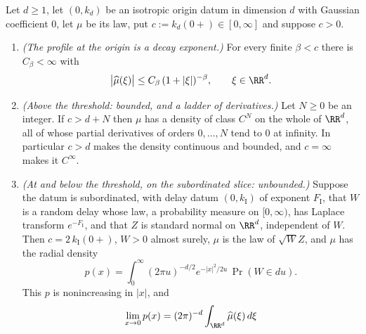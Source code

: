 \begin{theorem}
\label{thm:origin-boundedness-d}
\leanok
Let $d \ge 1$, let $(0, k_d)$ be an isotropic origin datum in dimension $d$ with Gaussian
coefficient $0$, let $\mu$ be its law, put $c := k_d(0{+}) \in [0,\infty]$ and suppose $c > 0$.
\begin{enumerate}
\item \emph{(The profile at the origin is a decay exponent.)} For every finite $\beta < c$ there
is $C_\beta < \infty$ with
\[
  \bigl|\widehat\mu(\xi)\bigr| \le C_\beta\,(1+|\xi|)^{-\beta}, \qquad \xi \in \RR^d .
\]
\item \emph{(Above the threshold: bounded, and a ladder of derivatives.)} Let $N \ge 0$ be an
integer. If $c > d + N$ then $\mu$ has a density of class $C^N$ on the whole of $\RR^d$, all of
whose partial derivatives of orders $0,\dots,N$ tend to $0$ at infinity. In particular $c > d$
makes the density continuous and bounded, and $c = \infty$ makes it $C^\infty$.
\item \emph{(At and below the threshold, on the subordinated slice: unbounded.)} Suppose the
datum is subordinated, with delay datum $(0,k_{\mathrm I})$ of exponent $F_{\mathrm I}$, that $W$
is a random delay whose law, a probability measure on $[0,\infty)$, has Laplace transform
$e^{-F_{\mathrm I}}$, and that $Z$ is standard normal on $\RR^d$, independent of $W$. Then
$c = 2\,k_{\mathrm I}(0{+})$, $W > 0$ almost surely, $\mu$ is the law of $\sqrt{W}Z$, and $\mu$
has the radial density
\begin{equation}\label{eq:mixture-density}
  p(x) = \int_0^\infty (2\pi u)^{-d/2}e^{-|x|^2/2u}\,\Pr(W \in du) .
\end{equation}
This $p$ is nonincreasing in $|x|$, and
\[
  \lim_{x \to 0} p(x) = (2\pi)^{-d}\int_{\RR^d}\widehat\mu(\xi)\,d\xi
\]
\end{enumerate}
\end{theorem}
